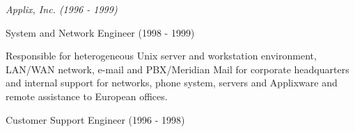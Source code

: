 \documentclass[11pt,article,oneside]{memoir}
\begin{document}
\normalsize

\bigskip
\noindent\emph{Applix, Inc. (1996 - 1999)}

\ind \footnotesize System and Network Engineer (1998 - 1999)

\ind \hspace{0.35in} \footnotesize Responsible for heterogeneous Unix server and workstation environment, LAN/WAN network, e-mail and PBX/Meridian Mail for
corporate headquarters and internal support for networks, phone system, servers and Applixware and remote assistance to European offices.

\ind \footnotesize Customer Support Engineer (1996 - 1998)

















\end{document}

